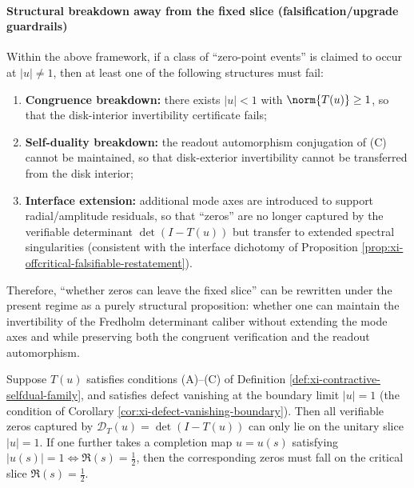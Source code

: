 \paragraph{Structural breakdown away from the fixed slice (falsification/upgrade guardrails)}
Within the above framework, if a class of ``zero-point events'' is claimed to occur at \(|u|\neq 1\), then at least one of the following structures must fail:
\begin{enumerate}
  \item \textbf{Congruence breakdown:} there exists \(|u|<1\) with \(\norm{T(u)}\ge 1\), so that the disk-interior invertibility certificate fails;
  \item \textbf{Self-duality breakdown:} the readout automorphism conjugation of (C) cannot be maintained, so that disk-exterior invertibility cannot be transferred from the disk interior;
  \item \textbf{Interface extension:} additional mode axes are introduced to support radial/amplitude residuals, so that ``zeros'' are no longer captured by the verifiable determinant \(\det(I-T(u))\) but transfer to extended spectral singularities (consistent with the interface dichotomy of Proposition \ref{prop:xi-offcritical-falsifiable-restatement}).
\end{enumerate}
Therefore, ``whether zeros can leave the fixed slice'' can be rewritten under the present regime as a purely structural proposition: whether one can maintain the invertibility of the Fredholm determinant caliber without extending the mode axes and while preserving both the congruent verification and the readout automorphism.
\par

\begin{theorem}\label{thm:xi-contract-defect-critical-slice-principle}
Suppose \(T(u)\) satisfies conditions (A)--(C) of Definition \ref{def:xi-contractive-selfdual-family}, and satisfies defect vanishing at the boundary limit \(|u|=1\) (the condition of Corollary \ref{cor:xi-defect-vanishing-boundary}).
Then all verifiable zeros captured by \(\mathcal{D}_T(u)=\det(I-T(u))\) can only lie on the unitary slice \(|u|=1\).
If one further takes a completion map \(u=u(s)\) satisfying \(|u(s)|=1\iff \Re(s)=\tfrac12\), then the corresponding zeros must fall on the critical slice \(\Re(s)=\tfrac12\).
\end{theorem}

\endinput
